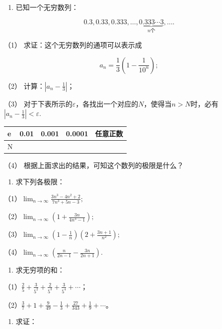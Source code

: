\begin{enumerate}[start=4]
\item
  已知一个无穷数列：
\end{enumerate}

\[
0.3, 0.33, 0.333, \dots, \underbrace {0.333 \cdots 3}_{n \text{个}}, \dots.
\]

（1） 求证：这个无穷数列的通项可以表示成

\[
a_{n} = \frac{1}{3} \left(1 - \frac{1}{10^{n}}\right);
\]

（2） 计算：\(\left|a_{n}-\frac{1}{3}\right|\)；

（3）
对于下表所示的\(\varepsilon\)，各找出一个对应的\(N\)，使得当\(n > N\)时，必有\(\left|a_{n} - \frac{1}{3}\right| < \varepsilon.\)

{\def\LTcaptype{none} %
\begin{longtable}[]{@{}lllll@{}}
\toprule\noalign{}
e & 0.01 & 0.001 & 0.0001 & 任意正数 \\
\midrule\noalign{}
\endhead
\bottomrule\noalign{}
\endlastfoot
N & & & & \\
\end{longtable}
}

（4） 根据上面求出的结果，可知这个数列的极限是什么？

\begin{enumerate}[start=5]
\item
  求下列各极限：
\end{enumerate}

（1）\(\lim_{n\to \infty}\frac{3n^3 - 4n^2 + 2}{7n^3 + 5n - 3};\)

（2）\(\lim_{n\to \infty}\left(1 + \frac{3n}{4n^3 - 1}\right);\)

（3）\(\lim_{n\to \infty}\left(1 - \frac{1}{n}\right)\left(2 + \frac{3n + 1}{n^2}\right);\)

（4）\(\lim_{n\to \infty}\left(\frac{n}{2n - 1} -\frac{3n}{2n + 1}\right).\)

\begin{enumerate}[start=6]
\item
  求无穷项的和：
\end{enumerate}

（1）\(\frac{2}{5} + \frac{3}{5^2} + \frac{2}{5^3} + \frac{3}{5^4} + \cdots\)；

（2）\(\frac{3}{7} + 1 + \frac{9}{49} - \frac{1}{3} + \frac{27}{343} + \frac{1}{9} + \cdots\)。

\begin{enumerate}[start=7]
\item
  求证：
\end{enumerate}

